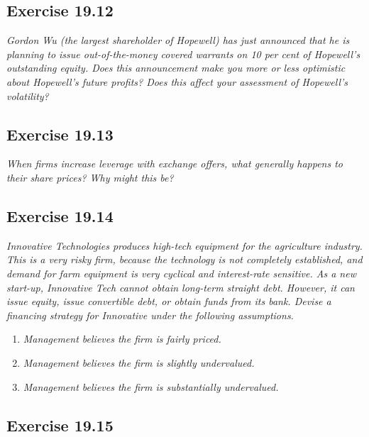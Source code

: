 \documentclass[]{book}
\theoremstyle{definition}
\theoremstyle{definition}
\theoremstyle{remark}
\begin{document}
\subsection{Exercise 19.12}\label{exercise-19.12}

\emph{Gordon Wu (the largest shareholder of Hopewell) has just announced
that he is planning to issue out-of-the-money covered warrants on 10 per
cent of Hopewell's outstanding equity. Does this announcement make you
more or less optimistic about Hopewell's future profits? Does this
affect your assessment of Hopewell's volatility?} \citep[p.642]{book}

\subsection{Exercise 19.13}\label{exercise-19.13}

\emph{When firms increase leverage with exchange offers, what generally
happens to their share prices? Why might this be?} \citep[p.642]{book}

\subsection{Exercise 19.14}\label{exercise-19.14}

\emph{Innovative Technologies produces high-tech equipment for the
agriculture industry. This is a very risky firm, because the technology
is not completely established, and demand for farm equipment is very
cyclical and interest-rate sensitive. As a new start-up, Innovative Tech
cannot obtain long-term straight debt. However, it can issue equity,
issue convertible debt, or obtain funds from its bank. Devise a
financing strategy for Innovative under the following assumptions.}
\citep[p.642]{book}

\begin{enumerate}
\def\labelenumi{\alph{enumi}.}
\item
  \emph{Management believes the firm is fairly priced.}
  \citep[p.642]{book}
\item
  \emph{Management believes the firm is slightly undervalued.}
  \citep[p.642]{book}
\item
  \emph{Management believes the firm is substantially undervalued.}
  \citep[p.642]{book}
\end{enumerate}

\subsection{Exercise 19.15}\label{exercise-19.15}
\end{document}

